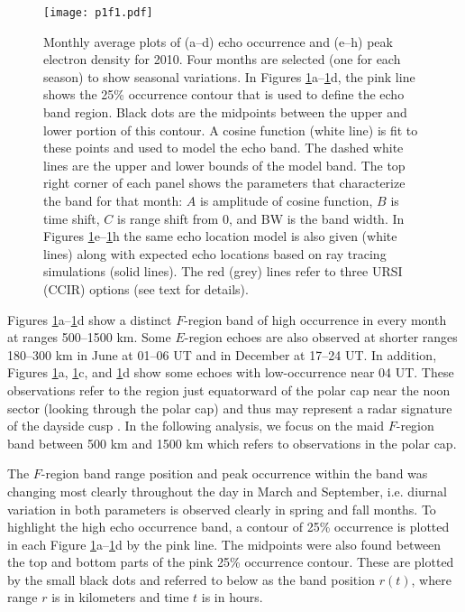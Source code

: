 \begin{figure}
	\centering
	\texttt{[image: p1f1.pdf]}
	\caption[Monthly average echo occurrence and electron density]{Monthly average plots of (a--d) echo occurrence and (e--h) peak electron density for 2010.  Four months are selected (one for each season) to show seasonal variations. In Figures \ref{fig:month_avg_occ}a--\ref{fig:month_avg_occ}d,  the pink line shows the 25\% occurrence contour that is used to define the echo band region. Black dots are the midpoints between the upper and lower portion of this contour.  A cosine function (white line) is fit to these points and used to model the echo band. The dashed white lines are the upper and lower bounds of the model band. The top right corner of each panel shows the parameters that characterize the band for that month: \(A\) is amplitude of cosine function, \(B\) is time shift, \(C\) is range shift from 0, and BW is the band width.  In Figures \ref{fig:month_avg_occ}e--\ref{fig:month_avg_occ}h the same echo location model is also given (white lines) along with expected echo locations based on ray tracing simulations (solid lines).  The red (grey) lines refer to three URSI (CCIR) options (see text for details).}
	\label{fig:month_avg_occ}
\end{figure}

Figures \ref{fig:month_avg_occ}a--\ref{fig:month_avg_occ}d show a distinct \(F\)-region band of high occurrence in every month at ranges 500--1500 km. Some \(E\)-region echoes are also observed at shorter ranges 180--300 km in June at 01--06 UT and in December at 17--24 UT.  In addition, Figures \ref{fig:month_avg_occ}a, \ref{fig:month_avg_occ}c, and \ref{fig:month_avg_occ}d show some echoes with low-occurrence near 04 UT.  These observations refer to the region just equatorward of the polar cap near the noon sector (looking through the polar cap) and thus may represent a radar signature of the dayside cusp \citep{Yeoman2002}.  In the following analysis, we focus on the maid \(F\)-region band between 500 km and 1500 km which refers to observations in the polar cap.

The \(F\)-region band range position and peak occurrence within the band was changing most clearly throughout the day in March and September, i.e. diurnal variation in both parameters is observed clearly in spring and fall months. To highlight the high echo occurrence band, a contour of 25\% occurrence is plotted in each Figure \ref{fig:month_avg_occ}a--\ref{fig:month_avg_occ}d by the pink line.  The midpoints were also found between the top and bottom parts of the pink 25\% occurrence contour.  These are plotted by the small black dots and referred to below as the band position \(r(t)\), where range \(r\) is in kilometers and time \(t\) is in hours.

